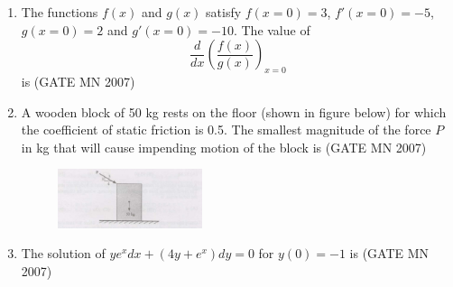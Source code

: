 \documentclass[journal]{IEEEtran}
\begin{document}
\begin{enumerate}
\item The functions $f(x)$ and $g(x)$ satisfy $f(x=0)=3$, $f'(x=0)=-5$, $g(x=0)=2$ and $g'(x=0)=-10$. The value of 
\[
\frac{d}{dx} \left( \frac{f(x)}{g(x)} \right)_{x=0}
\]
is
\hfill (GATE MN 2007)
\begin{enumerate}
\end{enumerate}



\item A wooden block of 50 kg rests on the floor (shown in figure below) for which the coefficient of static friction is 0.5. The smallest magnitude of the force $P$ in kg that will cause impending motion of the block is
	\hfill (GATE MN 2007)
	\begin{figure}[H]
    \centering
\includegraphics[width=0.4\textwidth]{Screenshot_2025_0812_123307.png}
\caption*{}
    \label{fig:Q24}
\end{figure}
\begin{enumerate}
\end{enumerate}


\item The solution of $y e^x dx + (4y + e^x) dy = 0$ for $y(0) = -1$ is
	\hfill (GATE MN 2007)
\begin{enumerate}
\end{enumerate}



\end{enumerate}
\end{document}
